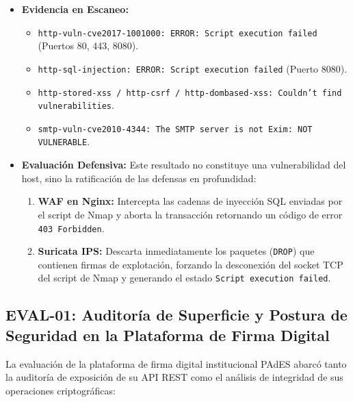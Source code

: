 \begin{itemize}
  \item \textbf{Evidencia en Escaneo:}
    \begin{itemize}
      \item \texttt{http-vuln-cve2017-1001000: ERROR: Script execution failed} (Puertos 80, 443, 8080).
      \item \texttt{http-sql-injection: ERROR: Script execution failed} (Puerto 8080).
      \item \texttt{http-stored-xss / http-csrf / http-dombased-xss: Couldn't find vulnerabilities}.
      \item \texttt{smtp-vuln-cve2010-4344: The SMTP server is not Exim: NOT VULNERABLE}.
    \end{itemize}
  \item \textbf{Evaluación Defensiva:} Este resultado no constituye una vulnerabilidad del host, sino la ratificación de las defensas en profundidad:
    \begin{enumerate}
      \item \textbf{WAF en Nginx:} Intercepta las cadenas de inyección SQL enviadas por el script de Nmap y aborta la transacción retornando un código de error \texttt{403 Forbidden}.
      \item \textbf{Suricata IPS:} Descarta inmediatamente los paquetes (\texttt{DROP}) que contienen firmas de explotación, forzando la desconexión del socket TCP del script de Nmap y generando el estado \texttt{Script execution failed}.
    \end{enumerate}
\end{itemize}

\subsection{EVAL-01: Auditoría de Superficie y Postura de Seguridad en la Plataforma de Firma Digital}

La evaluación de la plataforma de firma digital institucional PAdES abarcó tanto la auditoría de exposición de su API REST como el análisis de integridad de sus operaciones criptográficas:


